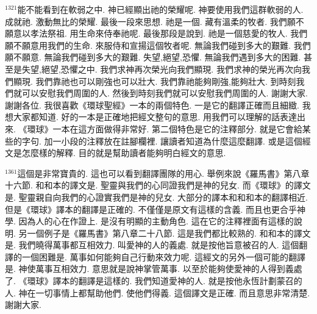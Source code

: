 \documentclass{book}
\begin{document}
$^{1321}$能不能看到在軟弱之中.
神已經顯出祂的榮耀呢.
神要使用我們這群軟弱的人.
成就祂.
激動無比的榮耀.
最後一段來思想.
祂是一個.
藏有溫柔的牧者.
我們願不願意以孝法祭祖.
用生命來侍奉祂呢.
最後那段是說到.
祂是一個慈愛的牧人.
我們願不願意用我們的生命.
來服侍和宣揚這個牧者呢.
無論我們碰到多大的艱難.
我們願不願意.
無論我們碰到多大的艱難.
失望,絕望,恐懼.
無論我們遇到多大的困難.
甚至是失望,絕望,恐懼之中.
我們求神再次榮光向我們顯現.
我們求神的榮光再次向我們顯現.
我們靠祂也可以剛強也可以壯大.
我們靠祂能夠剛強,能夠壯大.
到時刻我們就可以安慰我們周圍的人.
然後到時刻我們就可以安慰我們周圍的人.
謝謝大家.
謝謝各位.
我很喜歡《環球聖經》一本的兩個特色.
一是它的翻譯正確而且細緻.
我想大家都知道.
好的一本是正確地把經文整句的意思.
用我們可以理解的話表達出來.
《環球》一本在這方面做得非常好.
第二個特色是它的注釋部分.
就是它會給某些的字句.
加一小段的注釋放在註腳欄裡.
讓讀者知道為什麼這麼翻譯.
或是這個經文是怎麼樣的解釋.
目的就是幫助讀者能夠明白經文的意思.

$^{1361}$這個是非常寶貴的.
這也可以看到翻譯團隊的用心.
舉例來說《羅馬書》第八章十六節.
和和本的譯文是.
聖靈與我們的心同證我們是神的兒女.
而《環球》的譯文是.
聖靈親自向我們的心證實我們是神的兒女.
大部分的譯本和和和本的翻譯相近.
但是《環球》譯本的翻譯是正確的.
不僅僅是原文有這樣的含義.
而且也更合乎神學.
因為人的心在作證上.
是沒有明顯的主動角色.
這在它的注釋裡面有這樣的說明.
另一個例子是《羅馬書》第八章二十八節.
這是我們都比較熟的.
和和本的譯文是.
我們曉得萬事都互相效力.
叫愛神的人的義處.
就是按他旨意被召的人.
這個翻譯的一個困難是.
萬事如何能夠自己行動來效力呢.
這經文的另外一個可能的翻譯是.
神使萬事互相效力.
意思就是說神掌管萬事.
以至於能夠使愛神的人得到義處了.
《環球》譯本的翻譯是這樣的.
我們知道愛神的人.
就是按他永恆計劃蒙召的人.
神在一切事情上都幫助他們.
使他們得義.
這個譯文是正確.
而且意思非常清楚.
謝謝大家.
\newpage
\end{document}
